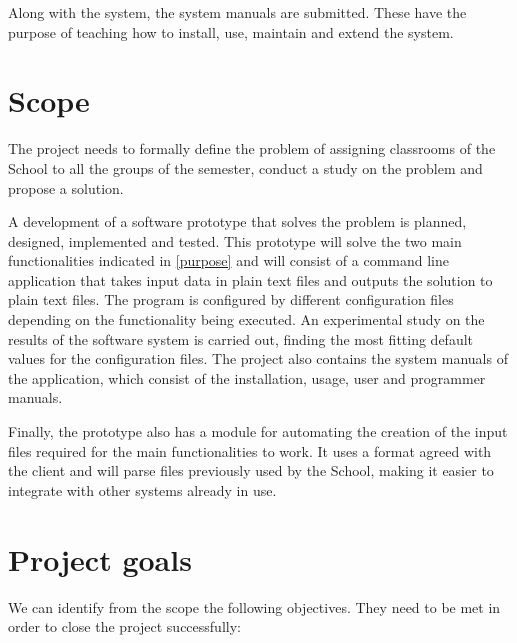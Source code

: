 Along with the system, the system manuals are submitted. These have the purpose of teaching how to install, use, maintain and extend the system.


\section{Scope}

The project needs to formally define the problem of assigning classrooms of the School to all the groups of the semester, conduct a study on the problem and propose a solution. 

A development of a software prototype that solves the problem is planned, designed, implemented and tested. This prototype will solve the two main functionalities indicated in \ref{purpose} and will consist of a command line application that takes input data in plain text files and outputs the solution to plain text files. The program is configured by different configuration files depending on the functionality being executed. An experimental study on the results of the software system is carried out, finding the most fitting default values for the configuration files. The project also contains the system manuals of the application, which consist of the installation, usage, user and programmer manuals. 

Finally, the prototype also has a module for automating the creation of the input files required for the main functionalities to work. It uses a format agreed with the client and will parse files previously used by the School, making it easier to integrate with other systems already in use.


\section{Project goals}

We can identify from the scope the following objectives. They need to be met in order to close the project successfully:

